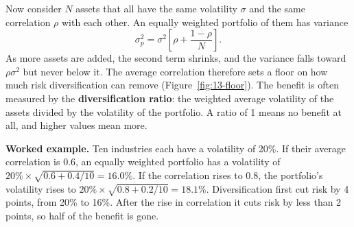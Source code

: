 Now consider $N$ assets that all have the same volatility $\sigma$ and the same correlation $\rho$ with each other. An equally weighted portfolio of them has variance
\begin{equation}
  \sigma_p^2 = \sigma^2\left[\rho + \frac{1 - \rho}{N}\right].
  \label{eq:13-varN}
\end{equation}
As more assets are added, the second term shrinks, and the variance falls toward $\rho\sigma^2$ but never below it. The average correlation therefore sets a floor on how much risk diversification can remove (Figure~\ref{fig:13-floor}). The benefit is often measured by the \textbf{diversification ratio}: the weighted average volatility of the assets divided by the volatility of the portfolio. A ratio of 1 means no benefit at all, and higher values mean more.

\textbf{Worked example.} Ten industries each have a volatility of 20\%. If their average correlation is 0.6, an equally weighted portfolio has a volatility of $20\% \times \sqrt{0.6 + 0.4/10} = 16.0\%$. If the correlation rises to 0.8, the portfolio's volatility rises to $20\% \times \sqrt{0.8 + 0.2/10} = 18.1\%$. Diversification first cut risk by 4 points, from 20\% to 16\%. After the rise in correlation it cuts risk by less than 2 points, so half of the benefit is gone.

